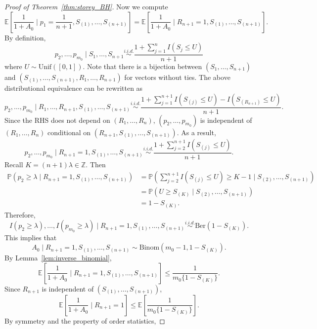 \documentclass[11pt]{article}
\def\E{\mathbb{E}}
\renewcommand{\P}{\mathbb{P}}
\newcommand{\lb}{\left(}
\newcommand{\rb}{\right)}
\begin{document}
\begin{proof}[Proof of Theorem~\ref{thm:storey_BH}]
Now we compute
\begin{equation}
  \label{eq:A0}
  \E\left[\frac{1}{1 + A_0}\mid p_1 = \frac{1}{n+1}, S_{(1)}, \ldots, S_{(n+1)}\right] = \E\left[\frac{1}{1 + A_0}\mid R_{n+1} = 1, S_{(1)}, \ldots, S_{(n+1)}\right].
\end{equation}
By definition, 
\[p_2, \ldots, p_{m_0} \mid S_1, \ldots, S_{n+1} \stackrel{i.i.d.}{\sim}\frac{1 + \sum_{j=1}^{n}I(S_j\le U)}{n + 1} \]
where $U\sim \mathrm{Unif}([0, 1])$. Note that there is a bijection between $(S_1, \ldots, S_{n+1})$ and $(S_{(1)}, \ldots, S_{(n+1)}, R_{1}, \ldots, R_{n+1})$ for vectors without ties. The above distributional equivalence can be rewritten as
\[p_2, \ldots, p_{m_0} \mid R_1, \ldots, R_{n+1}, S_{(1)}, \ldots, S_{(n+1)}  \stackrel{i.i.d.}{\sim}\frac{1 + \sum_{j=1}^{n+1}I(S_{(j)}\le U) - I(S_{(R_{n+1})} \le U)}{n + 1}.\]
Since the RHS does not depend on $(R_1, \ldots, R_n)$, $(p_2, \ldots, p_{m_0})$ is independent of $(R_1, \ldots, R_n)$ conditional on $(R_{n+1}, S_{(1)}, \ldots, S_{(n+1)})$. As a result,
\[p_2, \ldots, p_{m_0} \mid R_{n+1} = 1, S_{(1)}, \ldots, S_{(n+1)} \stackrel{i.i.d.}{\sim}\frac{1 + \sum_{j=2}^{n+1}I(S_{(j)}\le U)}{n + 1}.\]
Recall $K = (n + 1)\lambda\in \mathbb{Z}$. Then
\begin{align*}
  \P\lb p_2 \ge \lambda \mid R_{n+1} = 1, S_{(1)}, \ldots, S_{(n+1)}\rb
  & = \P\lb \sum_{j=2}^{n+1}I(S_{(j)}\le U)\ge K - 1 \mid S_{(2)}, \ldots, S_{(n+1)}\rb\\
  & = \P\lb U \ge S_{(K)}\mid S_{(2)}, \ldots, S_{(n+1)}\rb\\
  & = 1 - S_{(K)}.
\end{align*}
Therefore,
\[I(p_2 \ge \lambda), \ldots, I(p_{m_0} \ge \lambda) \mid R_{n+1} = 1, S_{(1)}, \ldots, S_{(n+1)} \stackrel{i.i.d.}{\sim}\mathrm{Ber}\lb 1 - S_{(K)}\rb.\]
This implies that
\[A_0\mid R_{n+1} = 1, S_{(1)}, \ldots, S_{(n+1)}\sim \mathrm{Binom}\lb m_0 - 1, 1 - S_{(K)}\rb.\]
By Lemma~\ref{lem:inverse_binomial},
\[\E\left[\frac{1}{1 + A_0}\mid R_{n+1} = 1, S_{(1)}, \ldots, S_{(n+1)}\right]\le \frac{1}{m_0 \{1 - S_{(K)}\}}.\]
Since $R_{n+1}$ is independent of $(S_{(1)}, \ldots, S_{(n+1)})$,
\begin{equation}
  \label{eq:EA0}
  \E\left[\frac{1}{1 + A_0}\mid R_{n+1} = 1\right] \le \E\left[\frac{1}{m_0 \{1 - S_{(K)}\}}\right].
\end{equation}
By symmetry and the property of order statistics,

\end{proof}
\end{document}
